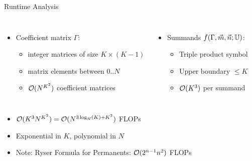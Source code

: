\begin{frame}[fragile]{Runtime Analysis}
%
\begin{columns}[t]
	\begin{itemize}
	\item Coefficient matrix $\Gamma$:
		\begin{itemize}
		\item integer matrices of size $K \times (K - 1)$
		\item matrix elements between $0..N$
		\item[\Thus] $\mathcal{O}(N^{K^2})$ coefficient matrices
		\end{itemize}
	\end{itemize}
%
	\begin{itemize}
	\item Summands $f(\Gamma, \vec{m}, \vec{n}; \mathbb{U})$:
		\begin{itemize}
		\item Triple product symbol
		\item Upper boundary $\leq K$
		\item[\Thus] $\mathcal{O}(K^3)$ per summand
		\end{itemize}
	\end{itemize}
\end{columns}
%
\vspace{6pt}
\begin{itemize}
\item[\Thus] $\mathcal{O}(K^3 N^{K^2}) = \mathcal{O}(N^{3\log_N(K) + K^2})$ FLOPs
\item Exponential in $K$, polynomial in $N$
\item Note: Ryser Formula for Permanents: $\mathcal{O}(2^{n - 1} n^2)$ FLOPs
\end{itemize}
%
\end{frame}


